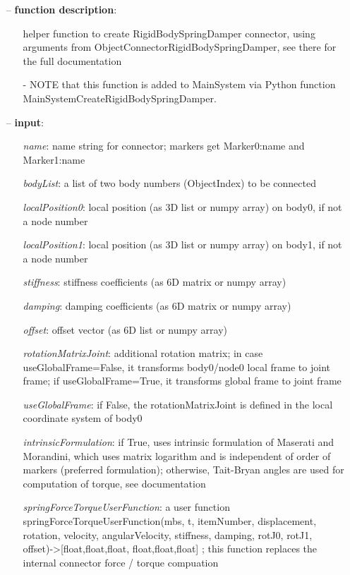 \begin{itemize}[leftmargin=0.7cm]
\item[--]
{\bf function description}: \vspace{-6pt}
\begin{itemize}[leftmargin=1.2cm]
\setlength{\itemindent}{-0.7cm}
\item[]helper function to create RigidBodySpringDamper connector, using arguments from ObjectConnectorRigidBodySpringDamper, see there for the full documentation
\item[]- NOTE that this function is added to MainSystem via Python function MainSystemCreateRigidBodySpringDamper.
\end{itemize}
\item[--]
{\bf input}: \vspace{-6pt}
\begin{itemize}[leftmargin=1.2cm]
\setlength{\itemindent}{-0.7cm}
\item[]{\it name}: name string for connector; markers get Marker0:name and Marker1:name
\item[]{\it bodyList}: a list of two body numbers (ObjectIndex) to be connected
\item[]{\it localPosition0}: local position (as 3D list or numpy array) on body0, if not a node number
\item[]{\it localPosition1}: local position (as 3D list or numpy array) on body1, if not a node number
\item[]{\it stiffness}: stiffness coefficients (as 6D matrix or numpy array)
\item[]{\it damping}: damping coefficients (as 6D matrix or numpy array)
\item[]{\it offset}: offset vector (as 6D list or numpy array)
\item[]{\it rotationMatrixJoint}: additional rotation matrix; in case  useGlobalFrame=False, it transforms body0/node0 local frame to joint frame; if useGlobalFrame=True, it transforms global frame to joint frame
\item[]{\it useGlobalFrame}: if False, the rotationMatrixJoint is defined in the local coordinate system of body0
\item[]{\it intrinsicFormulation}: if True, uses intrinsic formulation of Maserati and Morandini, which uses matrix logarithm and is independent of order of markers (preferred formulation); otherwise, Tait-Bryan angles are used for computation of torque, see documentation
\item[]{\it springForceTorqueUserFunction}: a user function springForceTorqueUserFunction(mbs, t, itemNumber, displacement, rotation, velocity, angularVelocity, stiffness, damping, rotJ0, rotJ1, offset)->[float,float,float, float,float,float] ; this function replaces the internal connector force / torque compuation

\end{itemize}
\end{itemize}
